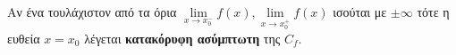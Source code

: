 Αν ένα τουλάχιστον από τα όρια $ \lim\limits_{x\to x_0^-}{f(x)},\lim\limits_{x\to x_0^+}{f(x)} $ ισούται με $ \pm\infty $ τότε η ευθεία $ x=x_0 $ λέγεται \textbf{κατακόρυφη ασύμπτωτη} της $ C_f $.

